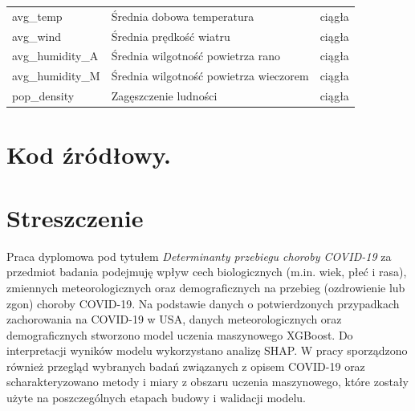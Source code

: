 \documentclass[polish, twoside, 12pt, a4paper]{article}
\theoremstyle{definition}
\theoremstyle{plain}
\theoremstyle{remark}
\begin{document}
\begin{landscape}
{\begin{longtable}{lll}
avg\_temp                 & Średnia dobowa temperatura                           & ciągła                        \\
avg\_wind                 & Średnia prędkość wiatru                              & ciągła                        \\
avg\_humidity\_A          & Średnia wilgotność powietrza rano                    & ciągła                        \\
avg\_humidity\_M          & Średnia wilgotność powietrza wieczorem               & ciągła                        \\
pop\_density              & Zagęszczenie ludności                                & ciągła                  \\
 
 \hline
\end{longtable}
}
\end{landscape}

\clearpage
\section{Kod źródłowy.}



 



\clearpage



\clearpage
{}
\listoftables

\clearpage
{}
\listoffigures



\clearpage
{}
\section*{Streszczenie}


Praca dyplomowa pod tytułem \emph{Determinanty przebiegu choroby COVID-19} za przedmiot badania podejmuję wpływ cech biologicznych (m.in. wiek, płeć i rasa), zmiennych meteorologicznych oraz demograficznych na przebieg (ozdrowienie lub zgon) choroby COVID-19. Na podstawie danych o potwierdzonych przypadkach zachorowania na COVID-19 w USA, danych meteorologicznych oraz demograficznych stworzono model uczenia maszynowego XGBoost. Do interpretacji wyników modelu wykorzystano analizę SHAP. W pracy sporządzono również przegląd wybranych badań związanych z opisem COVID-19 oraz scharakteryzowano metody i miary z obszaru uczenia maszynowego, które zostały użyte na poszczególnych etapach budowy i walidacji modelu.
\end{document}
